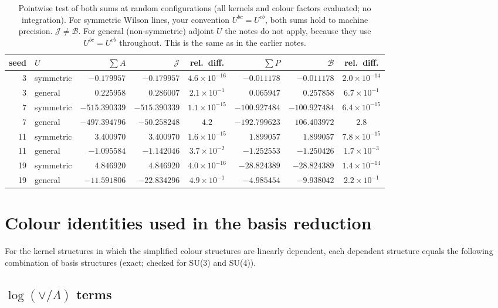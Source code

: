 \documentclass[10pt]{article}
\numberwithin{equation}{section}
\newcommand{\J}{\mathcal J}
\newcommand{\B}{\mathcal B}
\begin{document}
\begin{table}[H]
\centering\small
\begin{tabular}{@{}r l r r c r r c@{}}
seed & $U$ & $\sum A$ & $\J$ & rel.\ diff. & $\sum P$ & $\B$ & rel.\ diff.\\ \hline
3 & symmetric & $-0.179957$ & $-0.179957$ & $4.6\times10^{-16}$ & $-0.011178$ & $-0.011178$ & $2.0\times10^{-14}$\\
3 & general & $0.225958$ & $0.286007$ & $2.1\times10^{-1}$ & $0.065947$ & $0.257858$ & $6.7\times10^{-1}$\\
7 & symmetric & $-515.390339$ & $-515.390339$ & $1.1\times10^{-15}$ & $-100.927484$ & $-100.927484$ & $6.4\times10^{-15}$\\
7 & general & $-497.394796$ & $-50.258248$ & $4.2$ & $-192.799623$ & $106.403972$ & $2.8$\\
11 & symmetric & $3.400970$ & $3.400970$ & $1.6\times10^{-15}$ & $1.899057$ & $1.899057$ & $7.8\times10^{-15}$\\
11 & general & $-1.095584$ & $-1.142046$ & $3.7\times10^{-2}$ & $-1.252553$ & $-1.250426$ & $1.7\times10^{-3}$\\
19 & symmetric & $4.846920$ & $4.846920$ & $4.0\times10^{-16}$ & $-28.824389$ & $-28.824389$ & $1.4\times10^{-14}$\\
19 & general & $-11.591806$ & $-22.834296$ & $4.9\times10^{-1}$ & $-4.985454$ & $-9.938042$ & $2.2\times10^{-1}$\\
\end{tabular}
\caption{Pointwise test of both sums at random configurations (all kernels and colour factors evaluated; no integration). For symmetric Wilson lines, your convention $U^{bc}=U^{cb}$, both sums hold to machine precision. $\J\ne\B$. For general (non-symmetric) adjoint $U$ the notes do not apply, because they use $U^{bc}=U^{cb}$ throughout. This is the same as in the earlier notes.}
\label{tab:points}
\end{table}

\appendix
\section{Colour identities used in the basis reduction}\label{app:rel}
For the kernel structures in which the simplified colour structures are linearly dependent, each dependent structure equals the following combination of basis structures (exact; checked for SU(3) and SU(4)).
\subsection{\texorpdfstring{$\log(\vee/\Lambda)$}{log(vee/Lambda)} terms}
\end{document}
